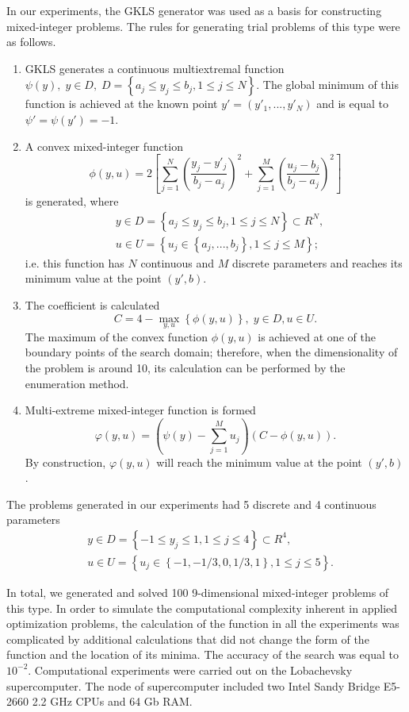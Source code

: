 \documentclass[
11pt,%
tightenlines,%
twoside,%
onecolumn,%
nofloats,%
nobibnotes,%
nofootinbib,%
superscriptaddress,%
noshowpacs,%
centertags]%
{revtex4}
\begin{document}
In our experiments, the GKLS generator was used as a basis for constructing mixed-integer problems. The rules for generating trial problems of this type were as follows.

\begin{enumerate}
	\item GKLS generates a continuous multiextremal function $\psi(y), \; y\in D, \; D = \left\{ a_j\leq y_j\leq b_j, 1\leq j \leq N \right\}$. The global minimum of this function is achieved at the known point $y'=(y'_1,...,y'_N)$ and is equal to $\psi'=\psi(y')=-1$.
	\item A convex mixed-integer function
	\[
			\phi (y,u) = 2 \left[ \sum_{j=1}^N \left( \frac{y_j - y'_j}{b_j-a_j} \right)^2 + \sum_{j=1}^M \left( \frac{u_j - b_j}{b_j-a_j} \right)^2 \right]
	\]
	is generated, where 
	\begin{eqnarray*}
	& y\in D = \left\{ a_j\leq y_j\leq b_j, 1\leq j \leq N \right\} \subset R^N, \\
	& u\in U = \left\{ u_j \in  \left\{a_j, ..., b_j \right\}, 1\leq j \leq M \right\};
	\end{eqnarray*}
	i.e. this function has $N$ continuous and $M$ discrete parameters and reaches its minimum value at the point $(y',b)$.
	\item The coefficient is calculated
	\[
	C = 4 - \max_{y,u} \left\{ \phi(y,u) \right\}, \; y\in D, u \in U.
	\]
	The maximum of the convex function $\phi(y,u)$ is achieved at one of the boundary points of the search domain; therefore, when the dimensionality of the problem is around 10, its calculation can be performed by the enumeration method. 
	\item  Multi-extreme mixed-integer function is formed
	\[
	\varphi(y,u) = \left(\psi(y) - \sum_{j=1}^M{u_j}\right)\left(C - \phi(y,u)\right).
	\]
	By construction, $\varphi(y,u)$ will reach the minimum value at the point $(y',b)$.
	
\end{enumerate}


The problems generated in our experiments had 5 discrete and 4 continuous parameters 
	\begin{eqnarray*}
	& y\in D = \left\{ -1 \leq y_j\leq 1, 1\leq j \leq 4 \right\} \subset R^4, \\
	& u\in U = \left\{ u_j \in  \left\{-1, -1/3, 0, 1/3, 1 \right\}, 1\leq j \leq 5 \right\}.
	\end{eqnarray*}


In total, we generated and solved 100 9-dimensional mixed-integer problems of this type. In order to simulate the computational complexity inherent in applied optimization problems, the calculation of the function in all the experiments was complicated by additional calculations that did not change the form of the function and the location of its minima.
The accuracy of the search was equal to $10^{-2}$. Computational experiments were carried out on the Lobachevsky supercomputer. The node of supercomputer included two Intel Sandy Bridge E5-2660 2.2 GHz CPUs and 64 Gb RAM. 
\end{document}
